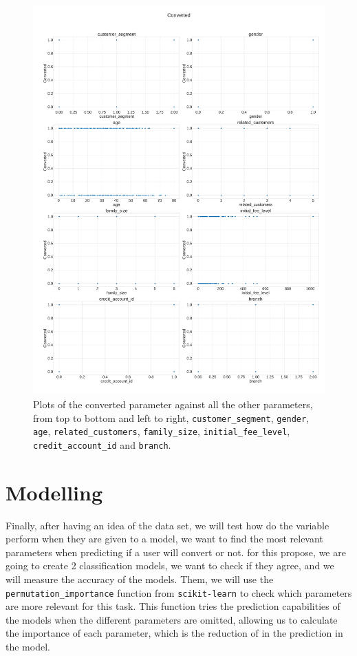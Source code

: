 \documentclass{article}
\begin{document}
\begin{figure}
\centering
\includegraphics[width=1\textwidth]{Figures/Scatter.pdf}
\caption{\label{fig:Scatter}Plots of the converted parameter against all the other parameters, from top to bottom and left to right, \texttt{customer\_segment}, \texttt{gender}, \texttt{age}, \texttt{related\_customers}, \texttt{family\_size}, \texttt{initial\_fee\_level}, \texttt{credit\_account\_id} and \texttt{branch}.}
\end{figure}

\section{Modelling}

Finally, after having an idea of the data set, we will test how do the variable perform when they are given to a model, we want to find the most relevant parameters when predicting if a user will convert or not. for this propose, we are going to create 2 classification models, we want to check if they agree, and we will measure the accuracy of the models. Them, we will use the \texttt{permutation\_importance} function from \texttt{scikit-learn} to check which parameters are more relevant for this task. This function tries the prediction capabilities of the models when the different parameters are omitted, allowing us to calculate the importance of each parameter, which is the reduction of in the prediction in the model.
\end{document}
